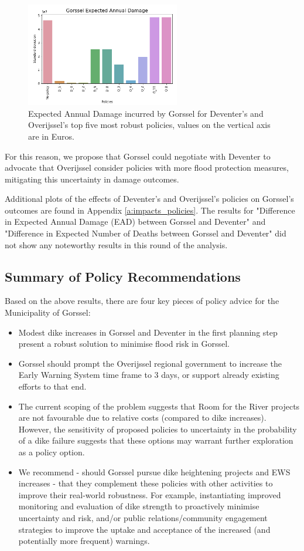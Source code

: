 \begin{figure}[h!]
    \centering
    \includegraphics[width=0.6\textwidth]{report/figures/results/spreads/EAD-spread-g.png}
    \caption{Expected Annual Damage incurred by Gorssel for Deventer's and Overijssel's top five most robust policies, values on the vertical axis are in Euros.}
    \label{fig:EAD-spread}
\end{figure}

For this reason, we propose that Gorssel could negotiate with Deventer to advocate that Overijssel consider policies with more flood protection measures, mitigating this uncertainty in damage outcomes.

Additional plots of the effects of Deventer's and Overijssel's policies on Gorssel's outcomes are found in Appendix \ref{a:impacts_policies}.
The results for "Difference in Expected Annual Damage (EAD) between Gorssel and Deventer" and "Difference in Expected Number of Deaths between Gorssel and Deventer" did not show any noteworthy results in this round of the analysis.  
\subsection{Summary of Policy Recommendations}
Based on the above results, there are four key pieces of policy advice for the Municipality of Gorssel:
\begin{itemize}
    \item Modest dike increases in Gorssel and Deventer in the first planning step present a robust solution to minimise flood risk in Gorssel.
    \item Gorssel should prompt the Overijssel regional government to increase the Early Warning System time frame to 3 days, or support already existing efforts to that end.
    \item The current scoping of the problem suggests that Room for the River projects are not favourable due to relative costs (compared to dike increases). However, the sensitivity of proposed policies to uncertainty in the probability of a dike failure suggests that these options may warrant further exploration as a policy option.
    \item We recommend - should Gorssel pursue dike heightening projects and EWS increases - that they complement these policies with other activities to improve their real-world robustness. For example, instantiating improved monitoring and evaluation of dike strength to proactively minimise uncertainty and risk, and/or public relations/community engagement strategies to improve the uptake and acceptance of the increased (and potentially more frequent) warnings.
\end{itemize}